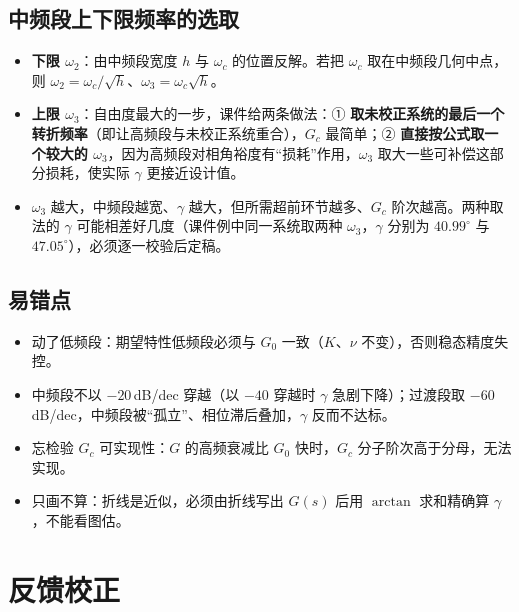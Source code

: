 \subsection{中频段上下限频率的选取}
\begin{itemize}
    \item \textbf{下限 $\omega_2$}：由中频段宽度 $h$ 与 $\omega_c$ 的位置反解。若把 $\omega_c$ 取在中频段几何中点，则 $\omega_2=\omega_c/\sqrt{h}$、$\omega_3=\omega_c\sqrt{h}$。
    \item \textbf{上限 $\omega_3$}：自由度最大的一步，课件给两条做法：① \textbf{取未校正系统的最后一个转折频率}（即让高频段与未校正系统重合），$G_c$ 最简单；② \textbf{直接按公式取一个较大的 $\omega_3$}，因为高频段对相角裕度有“损耗”作用，$\omega_3$ 取大一些可补偿这部分损耗，使实际 $\gamma$ 更接近设计值。
    \item $\omega_3$ 越大，中频段越宽、$\gamma$ 越大，但所需超前环节越多、$G_c$ 阶次越高。两种取法的 $\gamma$ 可能相差好几度（课件例中同一系统取两种 $\omega_3$，$\gamma$ 分别为 $40.99^\circ$ 与 $47.05^\circ$），必须逐一校验后定稿。
\end{itemize}

\subsection{易错点}
\begin{itemize}
    \item 动了低频段：期望特性低频段必须与 $G_0$ 一致（$K$、$\nu$ 不变），否则稳态精度失控。
    \item 中频段不以 $-20$\,dB/dec 穿越（以 $-40$ 穿越时 $\gamma$ 急剧下降）；过渡段取 $-60$\,dB/dec，中频段被“孤立”、相位滞后叠加，$\gamma$ 反而不达标。
    \item 忘检验 $G_c$ 可实现性：$G$ 的高频衰减比 $G_0$ 快时，$G_c$ 分子阶次高于分母，无法实现。
    \item 只画不算：折线是近似，必须由折线写出 $G(s)$ 后用 $\arctan$ 求和精确算 $\gamma$，不能看图估。
\end{itemize}

\bigskip

\section{反馈校正}

